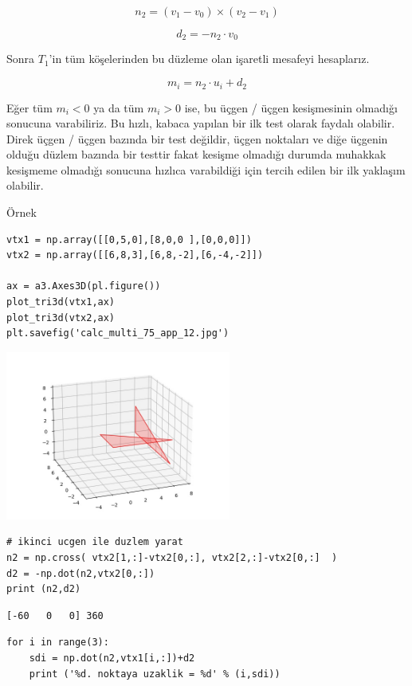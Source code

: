 \documentclass[12pt,fleqn]{article}\usepackage{../../common}
\begin{document}
$$
n_2 = (v_1-v_0) \times (v_2 - v_1)
$$

$$
d_2 = -n_2 \cdot v_0
$$

Sonra $T_1$'in tüm köşelerinden bu düzleme olan işaretli mesafeyi hesaplarız.

$$
m_i = n_2 \cdot u_i + d_2
$$

Eğer tüm $m_i < 0$ ya da tüm $m_i > 0$ ise, bu üçgen / üçgen kesişmesinin
olmadığı sonucuna varabiliriz. Bu hızlı, kabaca yapılan bir ilk test olarak
faydalı olabilir. Direk üçgen / üçgen bazında bir test değildir, üçgen noktaları
ve diğe üçgenin olduğu düzlem bazında bir testtir fakat kesişme olmadığı durumda
muhakkak kesişmeme olmadığı sonucuna hızlıca varabildiği için tercih edilen
bir ilk yaklaşım olabilir.

Örnek

\begin{verbatim}
vtx1 = np.array([[0,5,0],[8,0,0 ],[0,0,0]])
vtx2 = np.array([[6,8,3],[6,8,-2],[6,-4,-2]])

ax = a3.Axes3D(pl.figure())
plot_tri3d(vtx1,ax)
plot_tri3d(vtx2,ax)
plt.savefig('calc_multi_75_app_12.jpg')
\end{verbatim}

\includegraphics[width=20em]{calc_multi_75_app_12.jpg}

\begin{verbatim}
# ikinci ucgen ile duzlem yarat
n2 = np.cross( vtx2[1,:]-vtx2[0,:], vtx2[2,:]-vtx2[0,:]  )
d2 = -np.dot(n2,vtx2[0,:])
print (n2,d2)
\end{verbatim}

\begin{verbatim}
[-60   0   0] 360
\end{verbatim}

\begin{verbatim}
for i in range(3):
    sdi = np.dot(n2,vtx1[i,:])+d2
    print ('%d. noktaya uzaklik = %d' % (i,sdi))
\end{verbatim}
\end{document}
